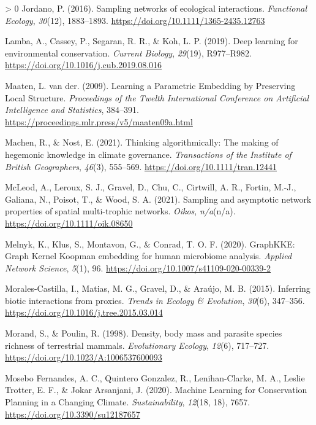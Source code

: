 \documentclass[11pt]{article}
\newlength{\cslhangindent}
\newenvironment{CSLReferences}[3] %
 {%
  \setlength{\parindent}{0pt}
  \ifodd #1 \everypar{\setlength{\hangindent}{\cslhangindent}}\ignorespaces\fi
  \ifnum #2 > 0
  \setlength{\parskip}{#2\baselineskip}
  \fi
 }%
 {}
\begin{document}
\begin{CSLReferences}{1}{0}
\leavevmode\hypertarget{ref-Jordano2016SamNet}{}%
Jordano, P. (2016). Sampling networks of ecological interactions.
\emph{Functional Ecology}, \emph{30}(12), 1883--1893.
\url{https://doi.org/10.1111/1365-2435.12763}

\leavevmode\hypertarget{ref-Lamba2019DeeLea}{}%
Lamba, A., Cassey, P., Segaran, R. R., \& Koh, L. P. (2019). Deep
learning for environmental conservation. \emph{Current Biology},
\emph{29}(19), R977--R982.
\url{https://doi.org/10.1016/j.cub.2019.08.016}

\leavevmode\hypertarget{ref-Maaten2009LeaPar}{}%
Maaten, L. van der. (2009). Learning a Parametric Embedding by
Preserving Local Structure. \emph{Proceedings of the Twelth
International Conference on Artificial Intelligence and Statistics},
384--391. \url{https://proceedings.mlr.press/v5/maaten09a.html}

\leavevmode\hypertarget{ref-Machen2021ThiAlg}{}%
Machen, R., \& Nost, E. (2021). Thinking algorithmically: The making of
hegemonic knowledge in climate governance. \emph{Transactions of the
Institute of British Geographers}, \emph{46}(3), 555--569.
\url{https://doi.org/10.1111/tran.12441}

\leavevmode\hypertarget{ref-McLeod2021SamAsy}{}%
McLeod, A., Leroux, S. J., Gravel, D., Chu, C., Cirtwill, A. R., Fortin,
M.-J., Galiana, N., Poisot, T., \& Wood, S. A. (2021). Sampling and
asymptotic network properties of spatial multi-trophic networks.
\emph{Oikos}, \emph{n/a}(n/a). \url{https://doi.org/10.1111/oik.08650}

\leavevmode\hypertarget{ref-Melnyk2020GraGra}{}%
Melnyk, K., Klus, S., Montavon, G., \& Conrad, T. O. F. (2020).
GraphKKE: Graph Kernel Koopman embedding for human microbiome analysis.
\emph{Applied Network Science}, \emph{5}(1), 96.
\url{https://doi.org/10.1007/s41109-020-00339-2}

\leavevmode\hypertarget{ref-Morales-Castilla2015InfBio}{}%
Morales-Castilla, I., Matias, M. G., Gravel, D., \& Araújo, M. B.
(2015). Inferring biotic interactions from proxies. \emph{Trends in
Ecology \& Evolution}, \emph{30}(6), 347--356.
\url{https://doi.org/10.1016/j.tree.2015.03.014}

\leavevmode\hypertarget{ref-Morand1998DenBod}{}%
Morand, S., \& Poulin, R. (1998). Density, body mass and parasite
species richness of terrestrial mammals. \emph{Evolutionary Ecology},
\emph{12}(6), 717--727. \url{https://doi.org/10.1023/A:1006537600093}

\leavevmode\hypertarget{ref-MoseboFernandes2020MacLea}{}%
Mosebo Fernandes, A. C., Quintero Gonzalez, R., Lenihan-Clarke, M. A.,
Leslie Trotter, E. F., \& Jokar Arsanjani, J. (2020). Machine Learning
for Conservation Planning in a Changing Climate. \emph{Sustainability},
\emph{12}(18, 18), 7657. \url{https://doi.org/10.3390/su12187657}


\end{CSLReferences}
\end{document}
